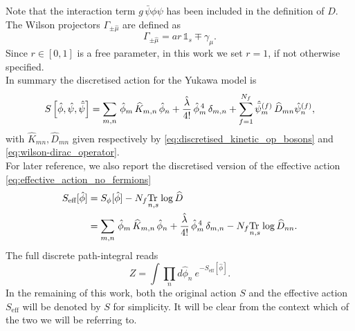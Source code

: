 Note that the interaction term $g\, \bar\psi\phi\psi$ has been included in the definition of $D$. \\
The Wilson projectors $\Gamma_{\pm \hat \mu}$ are defined as
\begin{equation*}
    \Gamma_{\pm \hat \mu} = ar \, \mathds{1}_s \mp \gamma_\mu.
\end{equation*}
Since $r \in [0,1]$ is a free parameter, in this work we set $r=1$, if not otherwise specified. \\
In summary the discretised action for the Yukawa model is 
\begin{equation}
    S\left[\hat{\phi}, \hat{\psi}, \hat{\bar{\psi}} \right] = \sum_{m,n} \, \hat{\phi}_m \, \widehat{K}_{m,n} \, \hat{\phi}_n + \frac{\hat{\lambda}}{4!} \, \hat{\phi}_m^{\,4} \, \delta_{m,n} + \sum_{f=1}^{N_f}\hat{\bar{\psi}}_m^{(f)} \, \widehat{D}_{mn} \hat{\psi}_n^{(f)},
    \label{eq:discretised_action}
\end{equation}
with $\widehat{K}_{mn}, \widehat{D}_{mn}$ given respectively by \eqref{eq:discretised_kinetic_op_bosons} and \eqref{eq:wilson-dirac_operator}. \\
For later reference, we also report the discretised version of the effective action \eqref{eq:effective_action_no_fermions}
\begin{equation}
	\begin{aligned}
		S_\text{eff}[\hat\phi] 	&= S_\phi[\hat\phi] - N_f \underset{n,s}{\operatorname{\text{Tr} \,}} \log \widehat{D} \\
							&= \sum_{m,n} \, \hat{\phi}_m \, \widehat{K}_{m,n} \, \hat{\phi}_n + \frac{\hat{\lambda}}{4!} \, \hat{\phi}_m^{\,4} \, \delta_{m,n} - N_f \underset{n,s}{\operatorname{\text{Tr} \,}} \log \widehat{D}_{nn}.
	\end{aligned}
	\label{eq:discretised_effective_action}
\end{equation}
The full discrete path-integral reads
\begin{equation}
    Z = \int \prod_n d\hat\phi_n \ e^{-S_\text{eff}[\hat\phi]}.
    \label{eq:discretised_path_integral}
\end{equation}
In the remaining of this work, both the original action $S$ and the effective action $S_\text{eff}$ will be denoted by $S$ for simplicity. It will be clear from the context which of the two we will be referring to.

